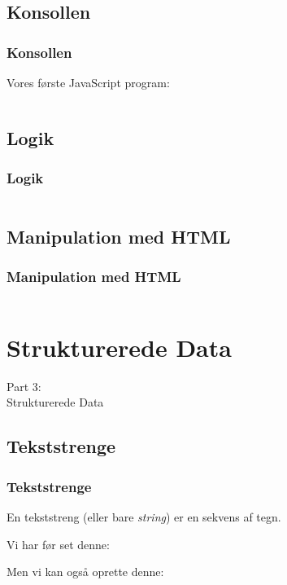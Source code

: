 \subsection{Konsollen}
\begin{frame}
    \frametitle{Konsollen}
    Vores første JavaScript program:
    \inputminted{javascript}{../src/frontend/part2_hello/logic.js}
\end{frame}

\subsection{Logik}
\begin{frame}
    \frametitle{Logik}
    \inputminted{javascript}{../src/frontend/part2_console/logic.js}
\end{frame}

\subsection{Manipulation med HTML}
\begin{frame}
    \frametitle{Manipulation med HTML}
    \vspace{-1mm}
    \inputminted[highlightlines={1,9,11,13},breaklines=true]{javascript}{../src/frontend/part2_html/logic.js}
\end{frame}

\section{Strukturerede Data}
\begin{frame}
    \vspace{25mm}
    \begin{center}
        \Huge{Part 3:\\Strukturerede Data}
    \end{center}
\end{frame}

\subsection{Tekststrenge}
\begin{frame}
    \frametitle{Tekststrenge}
    \vspace{3mm}
    En tekststreng (eller bare \textsl{string}) er en sekvens af tegn.
    
    \vspace{5mm}
    Vi har før set denne:
    \vspace{-1mm}
    \begin{center}
    \end{center}
    
    Men vi kan også oprette denne:
    \vspace{-1mm}
    \begin{center}
    \end{center}
\end{frame}

